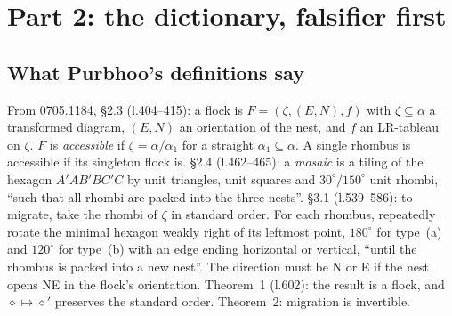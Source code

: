 \documentclass[11pt]{article}
\theoremstyle{definition}\newtheorem{definition}[theorem]{Definition}\newtheorem{remark}[theorem]{Remark}
\begin{document}
\section{Part 2: the dictionary, falsifier first}\label{sec:dict}
\subsection{What Purbhoo's definitions say}
From 0705.1184, \S2.3 (l.404--415): a flock is $F=(\zeta,(E,N),f)$ with $\zeta\subseteq\alpha$ a transformed diagram, $(E,N)$ an orientation of the nest, and $f$ an LR-tableau on $\zeta$. $F$ is \emph{accessible} if $\zeta=\alpha/\alpha_1$ for a straight $\alpha_1\subseteq\alpha$. A single rhombus is accessible if its singleton flock is. \S2.4 (l.462--465): a \emph{mosaic} is a tiling of the hexagon $A'AB'BC'C$ by unit triangles, unit squares and $30^\circ/150^\circ$ unit rhombi, ``such that all rhombi are packed into the three nests''. \S3.1 (l.539--586): to migrate, take the rhombi of $\zeta$ in standard order. For each rhombus, repeatedly rotate the minimal hexagon weakly right of its leftmost point, $180^\circ$ for type~(a) and $120^\circ$ for type~(b) with an edge ending horizontal or vertical, ``until the rhombus is packed into a new nest''. The direction must be N or E if the nest opens NE in the flock's orientation. Theorem~1 (l.602): the result is a flock, and $\diamond\mapsto\diamond'$ preserves the standard order. Theorem~2: migration is invertible.
\end{document}
